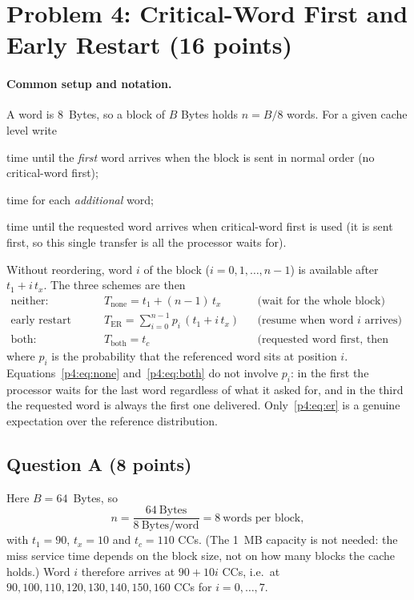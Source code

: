 \section*{Problem 4: Critical-Word First and Early Restart (16 points)}

\paragraph{Common setup and notation.}
A word is 8~Bytes, so a block of $B$ Bytes holds $n=B/8$ words. For a given cache
level write
\begin{description}\itemsep2pt
  \item[$t_1$] time until the \emph{first} word arrives when the block is sent in
        normal order (no critical-word first);
  \item[$t_x$] time for each \emph{additional} word;
  \item[$t_c$] time until the requested word arrives when critical-word first is
        used (it is sent first, so this single transfer is all the processor waits for).
\end{description}
Without reordering, word $i$ of the block ($i=0,1,\dots,n-1$) is available after
$t_1+i\,t_x$. The three schemes are then
\begin{align}
  \text{neither:}\quad & T_{\text{none}} = t_1+(n-1)\,t_x
    &&\text{(wait for the whole block)} \label{p4:eq:none}\\
  \text{early restart only:}\quad & T_{\text{ER}} = \sum_{i=0}^{n-1} p_i\,(t_1+i\,t_x)
    &&\text{(resume when word $i$ arrives)} \label{p4:eq:er}\\
  \text{both:}\quad & T_{\text{both}} = t_c
    &&\text{(requested word first, then resume)} \label{p4:eq:both}
\end{align}
where $p_i$ is the probability that the referenced word sits at position $i$.
Equations~\eqref{p4:eq:none} and~\eqref{p4:eq:both} do not involve $p_i$: in the first
the processor waits for the last word regardless of what it asked for, and in the third
the requested word is always the first one delivered. Only~\eqref{p4:eq:er} is a genuine
expectation over the reference distribution.

\subsection*{Question A (8 points)}

Here $B=64$~Bytes, so
\[
  n=\frac{64\ \text{Bytes}}{8\ \text{Bytes/word}}=8\ \text{words per block},
\]
with $t_1=90$, $t_x=10$ and $t_c=110$ CCs. (The 1~MB capacity is not needed: the miss
service time depends on the block size, not on how many blocks the cache holds.) Word
$i$ therefore arrives at $90+10i$ CCs, i.e.\ at
$90,100,110,120,130,140,150,160$ CCs for $i=0,\dots,7$.

